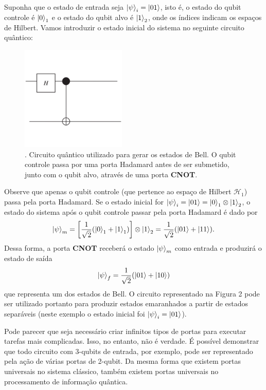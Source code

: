\documentclass{article}
\begin{document}
Suponha que o estado de entrada seja $\ket{\psi}_i = \ket{01}$, isto é, o estado do qubit controle é $\ket{0}_1$ e o estado do qubit alvo é $\ket{1}_2$, onde os índices indicam os espaços de Hilbert. Vamos introduzir o estado inicial do sistema no seguinte circuito quântico:
\begin{figure}[ht]
\centering
\includegraphics[width=5cm]{fig2novo.pdf}
\captionsetup{labelsep=none}
\caption{. Circuito quântico utilizado para gerar os estados de Bell. O qubit controle passa por uma porta Hadamard antes de ser submetido, junto com o qubit alvo, através de uma porta \textbf{CNOT}.}
\end{figure}
Observe que apenas o qubit controle (que pertence ao espaço de Hilbert $\mathcal{H}_1$) passa pela porta Hadamard. Se o estado inicial for $\ket{\psi}_i = \ket{01} = \ket{0}_1\otimes\ket{1}_2$, o estado do sistema após o qubit controle passar pela porta Hadamard é dado por
\begin{equation}
    \ket{\psi}_m = \left[ \frac{1}{\sqrt{2}}(\ket{0}_1 + \ket{1}_1) \right] \otimes \ket{1}_2 = \frac{1}{\sqrt{2}}(\ket{01} + \ket{11}).
\end{equation}
Dessa forma, a porta \textbf{CNOT} receberá o estado $\ket{\psi}_m$ como entrada e produzirá o estado de saída 
\begin{equation}
    \ket{\psi}_f = \frac{1}{\sqrt{2}}(\ket{01} + \ket{10}) 
\end{equation}
que representa um dos estados de Bell. O circuito representado na Figura 2 pode ser utilizado portanto para produzir estados emaranhados a partir de estados separáveis (neste exemplo o estado inicial foi $\ket{\psi}_i =\ket{01}$).

Pode parecer que seja necessário criar infinitos tipos de portas para executar tarefas mais complicadas. Isso, no entanto, não é verdade. É possível demonstrar que todo circuito com 3-qubits de entrada, por exemplo, pode ser representado pela ação de várias portas de 2-qubit. Da mesma forma que existem portas universais no sistema clássico, também existem portas universais no processamento de informação quântica.
\end{document}

